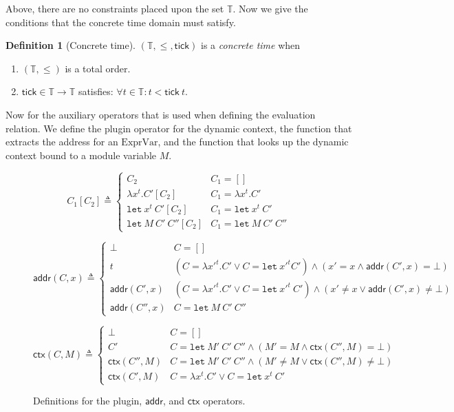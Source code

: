 \documentclass[acmsmall,screen,review]{acmart}
\theoremstyle{definition}
\newtheorem{definition}{Definition}[section]
\newcommand*{\ExprVar}{\text{ExprVar}}
\newcommand*{\Time}{\mathbb{T}}
\newcommand*{\addr}{\mathsf{addr}}
\newcommand*{\tick}{\mathsf{tick}}
\newcommand*{\modctx}{\mathsf{ctx}}
\newcommand*{\Let}{\mathtt{let}}
\begin{document}
Above, there are no constraints placed upon the set $\Time$.
Now we give the conditions that the concrete time domain must satisfy.

\begin{definition}[Concrete time]
  $(\Time, \le, \tick)$ is a \emph{concrete time} when
  \begin{enumerate}
    \item $(\Time, \le)$ is a total order.
    \item $\tick\in\Time\rightarrow\Time$ satisfies: $\forall t\in\Time: t < \tick\:t$.
  \end{enumerate}
\end{definition}

Now for the auxiliary operators that is used when defining the evaluation relation.
We define the plugin operator for the dynamic context,
the function that extracts the address for an $\ExprVar$,
and the function that looks up the dynamic context bound to a module variable $M$.
\begin{figure}[htb]
  \centering
  \footnotesize
  \[
    C_{1}[C_{2}]\triangleq
    \begin{cases}
      C_{2}                           & C_{1}=[]                       \\
      \lambda x^{t}.C'[C_{2}]         & C_{1}=\lambda x^{t}.C'         \\
      \mathtt{let}\:x^{t}\:C'[C_{2}]  & C_{1}=\mathtt{let}\:x^{t}\:C'  \\
      \mathtt{let}\:M\:C'\:C''[C_{2}] & C_{1}=\mathtt{let}\:M\:C'\:C''
    \end{cases}
  \]

  \[
    \addr(C,x)\triangleq
    \begin{cases}
      \bot         & C=[]                                                                                           \\
      t            & (C=\lambda x'^{t}.C'\lor C=\mathtt{let}\:x'^{t}C')\wedge (x'= x\wedge \addr(C',x)=\bot)        \\
      \addr(C',x)  & (C=\lambda x'^{t}.C'\lor C=\mathtt{let}\:x'^{t}\:C') \wedge (x'\neq x\lor \addr(C',x)\neq\bot) \\
      \addr(C'',x) & C=\mathtt{let}\:M\:C'\:C''
    \end{cases}
  \]

  \[
    \modctx(C,M)\triangleq
    \begin{cases}
      \bot           & C=[]                                                                   \\
      C'             & C=\mathtt{let}\:M'\:C'\:C''\wedge (M'= M\wedge\modctx(C'',M)=\bot)     \\
      \modctx(C'',M) & C=\mathtt{let}\:M'\:C'\:C''\wedge (M'\neq M\lor\modctx(C'',M)\neq\bot) \\
      \modctx(C',M)  & C=\lambda x^{t}.C'\lor C=\Let\:x^{t}\:C'
    \end{cases}
  \]
  \caption{Definitions for the plugin, $\addr$, and $\modctx$ operators.}
\end{figure}
\end{document}
